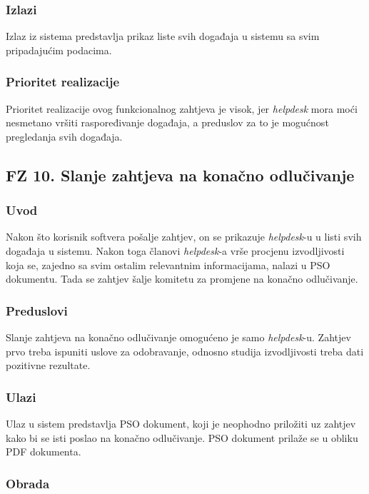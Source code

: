 \documentclass[12pt,a4paper]{article}
\begin{document}
\subsubsection{Izlazi}

Izlaz iz sistema predstavlja prikaz liste svih događaja u sistemu sa svim pripadajućim podacima.

\subsubsection{Prioritet realizacije}

Prioritet realizacije ovog funkcionalnog zahtjeva je visok, jer \textit{helpdesk} mora moći nesmetano vršiti raspoređivanje događaja, a preduslov za to je mogućnost pregledanja svih događaja.

\subsection{FZ 10. Slanje zahtjeva na konačno odlučivanje}

\subsubsection{Uvod}

Nakon što korisnik softvera pošalje zahtjev, on se prikazuje \textit{helpdesk}-u u listi svih događaja u sistemu. Nakon toga članovi \textit{helpdesk}-a vrše procjenu izvodljivosti koja se, zajedno sa svim ostalim relevantnim informacijama, nalazi u PSO dokumentu. Tada se zahtjev šalje komitetu za promjene na konačno odlučivanje.

\subsubsection{Preduslovi}

Slanje zahtjeva na konačno odlučivanje omogućeno je samo \textit{helpdesk}-u. Zahtjev prvo treba ispuniti uslove za odobravanje, odnosno studija izvodljivosti treba dati pozitivne rezultate.

\subsubsection{Ulazi}

Ulaz u sistem predstavlja PSO dokument, koji je neophodno priložiti uz zahtjev kako bi se isti poslao na konačno odlučivanje. PSO dokument prilaže se u obliku PDF dokumenta.

\subsubsection{Obrada}
\end{document}
